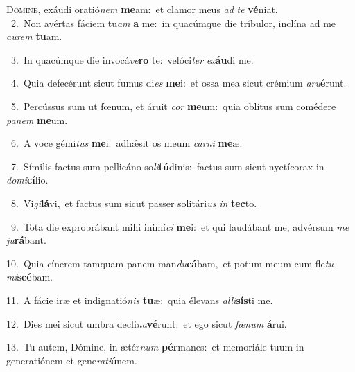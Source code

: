 \lettrine{\initial\textcolor{\initialcolor}{D}}{ómine,} exáudi oratió\textit{nem} \textbf{me}\-am:~\star et clamor meus \textit{ad} \textit{te} \textbf{vé}\-niat.\\
{\numbfont\textcolor{\numbcolor}{~2.}}~Non avértas fáciem tu\textit{am} \textbf{a} me:~\star in quacúmque die tríbulor, inclína ad me \textit{au}\-\textit{rem} \textbf{tu}\-am.\par
{\numbfont\textcolor{\numbcolor}{~3.}}~In quacúmque die invocá\-\textit{ve}\-\textbf{ro} te:~\star velóci\textit{ter} \textit{ex}\-\textbf{áu}di me.\par
{\numbfont\textcolor{\numbcolor}{~4.}}~Quia defecérunt sicut fumus di\textit{es} \textbf{me}\-i:~\star et ossa mea sicut crémium \textit{a}\-\textit{ru}\textbf{é}runt.\par
{\numbfont\textcolor{\numbcolor}{~5.}}~Percússus sum ut fœnum, et áruit \textit{cor} \textbf{me}\-um:~\star quia oblítus sum comédere \textit{pa}\-\textit{nem} \textbf{me}\-um.\par
{\numbfont\textcolor{\numbcolor}{~6.}}~A voce gémi\textit{tus} \textbf{me}\-i:~\star adhǽsit os meum \textit{car}\-\textit{ni} \textbf{me}\-æ.\par
{\numbfont\textcolor{\numbcolor}{~7.}}~Símilis factus sum pellicáno so\-\textit{li}\-\textbf{tú}dinis:~\star factus sum sicut nyctícorax in \textit{do}\-\textit{mi}\textbf{cí}lio.\par
{\numbfont\textcolor{\numbcolor}{~8.}}~Vi\-\textit{gi}\-\textbf{lá}vi,~\star et factus sum sicut passer solitári\textit{us} \textit{in} \textbf{tec}\-to.\par
{\numbfont\textcolor{\numbcolor}{~9.}}~Tota die exprobrábant mihi inimí\textit{ci} \textbf{me}\-i:~\star et qui laudábant me, advérsum \textit{me} \textit{ju}\-\textbf{rá}bant.\par
{\numbfont\textcolor{\numbcolor}{10.}}~Quia cínerem tamquam panem man\-\textit{du}\-\textbf{cá}bam,~\star et potum meum cum fle\textit{tu} \textit{mi}\-\textbf{scé}bam.\par
{\numbfont\textcolor{\numbcolor}{11.}}~A fácie iræ et indignatió\textit{nis} \textbf{tu}\-æ:~\star quia élevans \textit{al}\-\textit{li}\textbf{sís}ti me.\par
{\numbfont\textcolor{\numbcolor}{12.}}~Dies mei sicut umbra decli\-\textit{na}\-\textbf{vé}runt:~\star et ego sicut \textit{fœ}\-\textit{num} \textbf{á}\-rui.\par
{\numbfont\textcolor{\numbcolor}{13.}}~Tu autem, Dómine, in ætér\textit{num} \textbf{pér}\-manes:~\star et memoriále tuum in generatiónem et gene\-\textit{ra}\-\textit{ti}\textbf{ó}nem.\par
